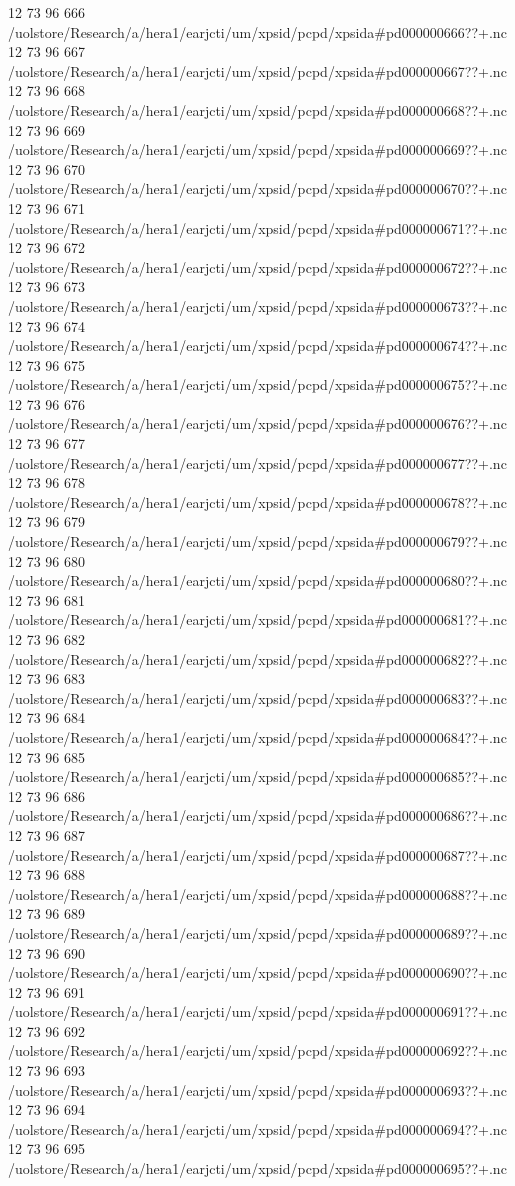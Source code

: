12 73 96
666
/uolstore/Research/a/hera1/earjcti/um/xpsid/pcpd/xpsida#pd000000666??+.nc
12 73 96
667
/uolstore/Research/a/hera1/earjcti/um/xpsid/pcpd/xpsida#pd000000667??+.nc
12 73 96
668
/uolstore/Research/a/hera1/earjcti/um/xpsid/pcpd/xpsida#pd000000668??+.nc
12 73 96
669
/uolstore/Research/a/hera1/earjcti/um/xpsid/pcpd/xpsida#pd000000669??+.nc
12 73 96
670
/uolstore/Research/a/hera1/earjcti/um/xpsid/pcpd/xpsida#pd000000670??+.nc
12 73 96
671
/uolstore/Research/a/hera1/earjcti/um/xpsid/pcpd/xpsida#pd000000671??+.nc
12 73 96
672
/uolstore/Research/a/hera1/earjcti/um/xpsid/pcpd/xpsida#pd000000672??+.nc
12 73 96
673
/uolstore/Research/a/hera1/earjcti/um/xpsid/pcpd/xpsida#pd000000673??+.nc
12 73 96
674
/uolstore/Research/a/hera1/earjcti/um/xpsid/pcpd/xpsida#pd000000674??+.nc
12 73 96
675
/uolstore/Research/a/hera1/earjcti/um/xpsid/pcpd/xpsida#pd000000675??+.nc
12 73 96
676
/uolstore/Research/a/hera1/earjcti/um/xpsid/pcpd/xpsida#pd000000676??+.nc
12 73 96
677
/uolstore/Research/a/hera1/earjcti/um/xpsid/pcpd/xpsida#pd000000677??+.nc
12 73 96
678
/uolstore/Research/a/hera1/earjcti/um/xpsid/pcpd/xpsida#pd000000678??+.nc
12 73 96
679
/uolstore/Research/a/hera1/earjcti/um/xpsid/pcpd/xpsida#pd000000679??+.nc
12 73 96
680
/uolstore/Research/a/hera1/earjcti/um/xpsid/pcpd/xpsida#pd000000680??+.nc
12 73 96
681
/uolstore/Research/a/hera1/earjcti/um/xpsid/pcpd/xpsida#pd000000681??+.nc
12 73 96
682
/uolstore/Research/a/hera1/earjcti/um/xpsid/pcpd/xpsida#pd000000682??+.nc
12 73 96
683
/uolstore/Research/a/hera1/earjcti/um/xpsid/pcpd/xpsida#pd000000683??+.nc
12 73 96
684
/uolstore/Research/a/hera1/earjcti/um/xpsid/pcpd/xpsida#pd000000684??+.nc
12 73 96
685
/uolstore/Research/a/hera1/earjcti/um/xpsid/pcpd/xpsida#pd000000685??+.nc
12 73 96
686
/uolstore/Research/a/hera1/earjcti/um/xpsid/pcpd/xpsida#pd000000686??+.nc
12 73 96
687
/uolstore/Research/a/hera1/earjcti/um/xpsid/pcpd/xpsida#pd000000687??+.nc
12 73 96
688
/uolstore/Research/a/hera1/earjcti/um/xpsid/pcpd/xpsida#pd000000688??+.nc
12 73 96
689
/uolstore/Research/a/hera1/earjcti/um/xpsid/pcpd/xpsida#pd000000689??+.nc
12 73 96
690
/uolstore/Research/a/hera1/earjcti/um/xpsid/pcpd/xpsida#pd000000690??+.nc
12 73 96
691
/uolstore/Research/a/hera1/earjcti/um/xpsid/pcpd/xpsida#pd000000691??+.nc
12 73 96
692
/uolstore/Research/a/hera1/earjcti/um/xpsid/pcpd/xpsida#pd000000692??+.nc
12 73 96
693
/uolstore/Research/a/hera1/earjcti/um/xpsid/pcpd/xpsida#pd000000693??+.nc
12 73 96
694
/uolstore/Research/a/hera1/earjcti/um/xpsid/pcpd/xpsida#pd000000694??+.nc
12 73 96
695
/uolstore/Research/a/hera1/earjcti/um/xpsid/pcpd/xpsida#pd000000695??+.nc
